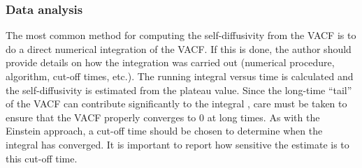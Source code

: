 \documentclass[9pt,bestpractices]{livecoms}
\begin{document}
 

\subsubsection{Data analysis} \label{sec:Self-Diffusivity:Green-Kubo: Data analysis}

The most common method for computing the self-diffusivity from the VACF is to do a direct numerical integration of the VACF. If this is done, the author should provide details on how the integration was carried out (numerical procedure, algorithm, cut-off times, etc.). The running integral versus time is calculated and the self-diffusivity is estimated from the plateau value. Since the long-time ``tail'' of the VACF can contribute significantly to the integral \cite{GROMACS,Allen2017}, care must be taken to ensure that the VACF properly converges to 0 at long times. As with the Einstein approach, a cut-off time should be chosen to determine when the integral has converged. It is important to report how sensitive the estimate is to this cut-off time. 

%
\end{document}
